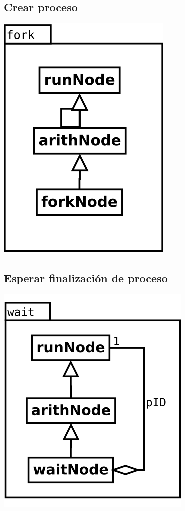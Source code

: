 \subsection {Crear proceso} 
\begin{center}
\includegraphics[scale=0.4]{fork.png} \\
\end{center}

\subsection {Esperar finalización de proceso} 
\begin{center}
\includegraphics[scale=0.4]{wait.png} \\
\end{center}

